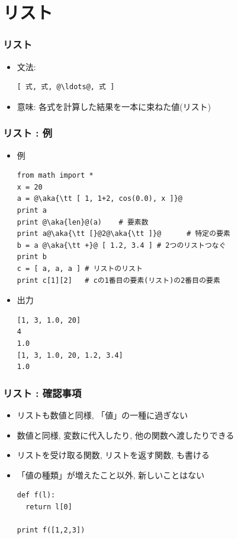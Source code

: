 \documentclass[10pt,dvipdfmx]{beamer}
\newcommand{\ao}[1]{{\color{blue}#1}}
\newcommand{\aka}[1]{{\color{red}#1}}
\begin{document}
\section{リスト}

\begin{frame}[fragile]
\frametitle{リスト}
\begin{itemize}
\item 文法:
\begin{lstlisting}
[ 式, 式, @\ldots@, 式 ]
\end{lstlisting}

\item 意味: 各式を計算した結果を一本に束ねた値(リスト)
\end{itemize}
\end{frame}

\begin{frame}[fragile]
\frametitle{リスト : 例}
\begin{itemize}
\item 例
\begin{lstlisting}
from math import *
x = 20
a = @\aka{\tt [ 1, 1+2, cos(0.0), x ]}@
print a
print @\aka{len}@(a)    # 要素数
print a@\aka{\tt [}@2@\aka{\tt ]}@      # 特定の要素
b = a @\aka{\tt +}@ [ 1.2, 3.4 ] # 2つのリストつなぐ
print b
c = [ a, a, a ] # リストのリスト
print c[1][2]   # cの1番目の要素(リスト)の2番目の要素
\end{lstlisting}

\item 出力
\begin{lstlisting}
[1, 3, 1.0, 20]
4
1.0
[1, 3, 1.0, 20, 1.2, 3.4]
1.0
\end{lstlisting}

\end{itemize}
\end{frame}

\begin{frame}[fragile]
\frametitle{リスト : 確認事項}
\begin{itemize}
\item リストも数値と同様, 「値」の一種に過ぎない
\item 数値と同様, 変数に代入したり, 他の関数へ渡したりできる
\item リストを受け取る関数, リストを返す関数, も書ける
\item \ao{「値の種類」が増えたこと以外, 新しいことはない}
\begin{lstlisting}
def f(l):
  return l[0]

print f([1,2,3]) 
\end{lstlisting}
\end{itemize}
\end{frame}
\end{document}
